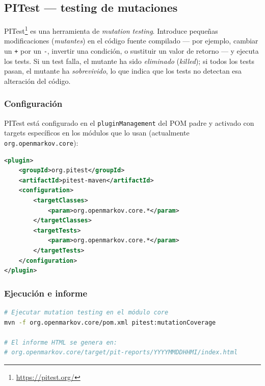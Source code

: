 \documentclass[12pt,a4paper]{article}
\begin{document}
\subsection{PITest --- testing de mutaciones}
\label{sec:pitest}

PITest\footnote{\url{https://pitest.org/}} es una herramienta de
\emph{mutation testing}. Introduce pequeñas modificaciones (\emph{mutantes})
en el código fuente compilado --- por ejemplo, cambiar un \texttt{+} por un
\texttt{-}, invertir una condición, o sustituir un valor de retorno --- y
ejecuta los tests. Si un test falla, el mutante ha sido \emph{eliminado}
(\emph{killed}); si todos los tests pasan, el mutante ha \emph{sobrevivido},
lo que indica que los tests no detectan esa alteración del código.

\subsubsection{Configuración}

PITest está configurado en el \texttt{pluginManagement} del POM padre y
activado con targets específicos en los módulos que lo usan (actualmente
\texttt{org.openmarkov.core}):

\begin{lstlisting}[caption={Configuración de PITest en el POM del módulo core},
  label={lst:pitest-config}, language=XML]
<plugin>
    <groupId>org.pitest</groupId>
    <artifactId>pitest-maven</artifactId>
    <configuration>
        <targetClasses>
            <param>org.openmarkov.core.*</param>
        </targetClasses>
        <targetTests>
            <param>org.openmarkov.core.*</param>
        </targetTests>
    </configuration>
</plugin>
\end{lstlisting}

\subsubsection{Ejecución e informe}

\begin{lstlisting}[caption={Ejecución de PITest}, label={lst:pitest-run},
  language=bash]
# Ejecutar mutation testing en el módulo core
mvn -f org.openmarkov.core/pom.xml pitest:mutationCoverage

# El informe HTML se genera en:
# org.openmarkov.core/target/pit-reports/YYYYMMDDHHMI/index.html
\end{lstlisting}
\end{document}
